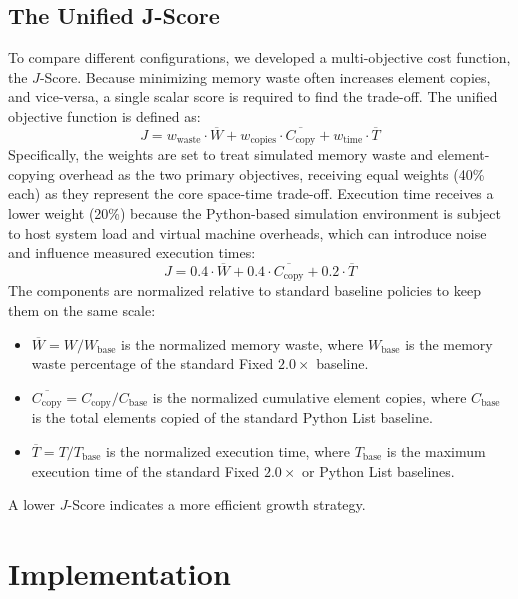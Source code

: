 \subsection{The Unified J-Score}
To compare different configurations, we developed a multi-objective cost function, the $J$-Score. Because minimizing memory waste often increases element copies, and vice-versa, a single scalar score is required to find the trade-off. The unified objective function is defined as:
\begin{equation}
    J = w_{\text{waste}} \cdot \overline{W} + w_{\text{copies}} \cdot \overline{C_{\text{copy}}} + w_{\text{time}} \cdot \overline{T}
\end{equation}
Specifically, the weights are set to treat simulated memory waste and element-copying overhead as the two primary objectives, receiving equal weights (40\% each) as they represent the core space-time trade-off. Execution time receives a lower weight (20\%) because the Python-based simulation environment is subject to host system load and virtual machine overheads, which can introduce noise and influence measured execution times:
\begin{equation}
    J = 0.4 \cdot \overline{W} + 0.4 \cdot \overline{C_{\text{copy}}} + 0.2 \cdot \overline{T}
\end{equation}
The components are normalized relative to standard baseline policies to keep them on the same scale:
\begin{itemize}
    \item $\overline{W} = W / W_{\text{base}}$ is the normalized memory waste, where $W_{\text{base}}$ is the memory waste percentage of the standard Fixed $2.0\times$ baseline.
    \item $\overline{C_{\text{copy}}} = C_{\text{copy}} / C_{\text{base}}$ is the normalized cumulative element copies, where $C_{\text{base}}$ is the total elements copied of the standard Python List baseline.
    \item $\overline{T} = T / T_{\text{base}}$ is the normalized execution time, where $T_{\text{base}}$ is the maximum execution time of the standard Fixed $2.0\times$ or Python List baselines.
\end{itemize}
A lower $J$-Score indicates a more efficient growth strategy.

\section{Implementation}

